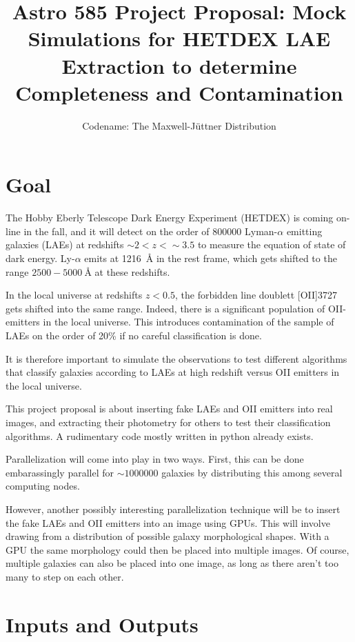 \documentclass[11pt]{article}
\title{Astro 585 Project Proposal: Mock Simulations for HETDEX LAE Extraction
to determine Completeness and Contamination}
\author{Codename: The Maxwell-Jüttner Distribution}
\begin{document}
\maketitle


\section{Goal}

The Hobby Eberly Telescope Dark Energy Experiment (HETDEX) is coming on-line in
the fall, and it will detect on the order of $\num{800000}$ Lyman-$\alpha$
emitting galaxies (LAEs) at redshifts $\sim2<z<\sim3.5$ to measure the equation
of state of dark energy. Ly-$\alpha$ emits at \SI{1216}{\angstrom} in the rest
frame, which gets shifted to the range $\num{2500}-\SI{5000}{\angstrom}$ at
these redshifts.

In the local universe at redshifts $z<0.5$, the forbidden line doublett
[OII]3727 gets shifted into the same range. Indeed, there is a significant
population of OII-emitters in the local universe. This introduces contamination
of the sample of LAEs on the order of 20\% if no careful classification is
done.

It is therefore important to simulate the observations to test different
algorithms that classify galaxies according to LAEs at high redshift versus OII
emitters in the local universe.

This project proposal is about inserting fake LAEs and OII emitters into real
images, and extracting their photometry for others to test their classification
algorithms. A rudimentary code mostly written in python already exists.

Parallelization will come into play in two ways. First, this can be done
embarassingly parallel for $\sim\num{1000000}$ galaxies by distributing this
among several computing nodes.

However, another possibly interesting parallelization technique will be to
insert the fake LAEs and OII emitters into an image using GPUs. This will
involve drawing from a distribution of possible galaxy morphological shapes.
With a GPU the same morphology could then be placed into multiple images. Of
course, multiple galaxies can also be placed into one image, as long as there
aren't too many to step on each other.


\section{Inputs and Outputs}
\end{document}

